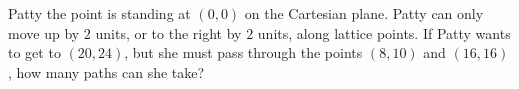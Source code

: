 Patty the point is standing at $(0, 0)$ on the Cartesian plane. Patty can only move up by $2$ units, or to the right by $2$ units, along lattice points. If Patty wants to get to $(20, 24)$, but she must pass through the points $(8, 10)$ and $(16, 16)$, how many paths can she take?
